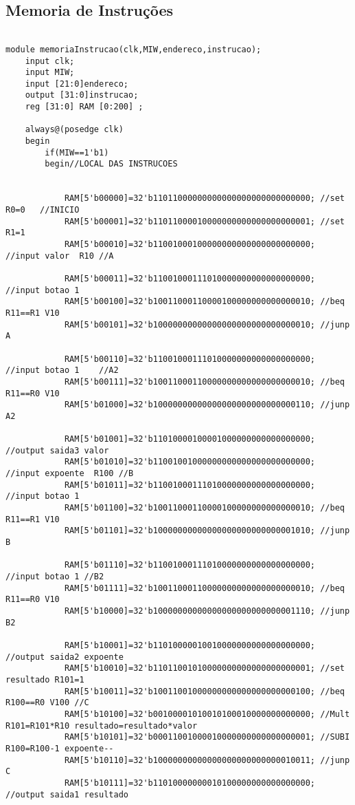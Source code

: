 \subsection{Memoria de Instruç\~oes}
\begin{lstlisting}

module memoriaInstrucao(clk,MIW,endereco,instrucao);
	input clk;
	input MIW;
	input [21:0]endereco;
	output [31:0]instrucao;
	reg [31:0] RAM [0:200] ;
	
	always@(posedge clk)
	begin
		if(MIW==1'b1)
		begin//LOCAL DAS INSTRUCOES
			
			
			RAM[5'b00000]=32'b11011000000000000000000000000000; //set R0=0   //INICIO
			RAM[5'b00001]=32'b11011000010000000000000000000001; //set R1=1
			RAM[5'b00010]=32'b11001000100000000000000000000000; //input valor  R10 //A 
			
			RAM[5'b00011]=32'b11001000111010000000000000000000; //input botao 1
			RAM[5'b00100]=32'b10011000110000100000000000000010; //beq R11==R1 V10
			RAM[5'b00101]=32'b10000000000000000000000000000010; //junp A
			
			RAM[5'b00110]=32'b11001000111010000000000000000000; //input botao 1    //A2
			RAM[5'b00111]=32'b10011000110000000000000000000010; //beq R11==R0 V10
			RAM[5'b01000]=32'b10000000000000000000000000000110; //junp A2
			
			RAM[5'b01001]=32'b11010000100001000000000000000000; //output saida3 valor
			RAM[5'b01010]=32'b11001001000000000000000000000000; //input expoente  R100 //B 
			RAM[5'b01011]=32'b11001000111010000000000000000000; //input botao 1
			RAM[5'b01100]=32'b10011000110000100000000000000010; //beq R11==R1 V10
			RAM[5'b01101]=32'b10000000000000000000000000001010; //junp B
			
			RAM[5'b01110]=32'b11001000111010000000000000000000; //input botao 1 //B2
			RAM[5'b01111]=32'b10011000110000000000000000000010; //beq R11==R0 V10
			RAM[5'b10000]=32'b10000000000000000000000000001110; //junp B2
			
			RAM[5'b10001]=32'b11010000010010000000000000000000; //output saida2 expoente
			RAM[5'b10010]=32'b11011001010000000000000000000001; //set resultado R101=1
			RAM[5'b10011]=32'b10011001000000000000000000000100; //beq R100==R0 V100 //C
			RAM[5'b10100]=32'b00100001010010100010000000000000; //Mult R101=R101*R10 resultado=resultado*valor
			RAM[5'b10101]=32'b00011001000010000000000000000001; //SUBI R100=R100-1 expoente--
			RAM[5'b10110]=32'b10000000000000000000000000010011; //junp C
			RAM[5'b10111]=32'b11010000000010100000000000000000; //output saida1 resultado 
			

\end{lstlisting}
